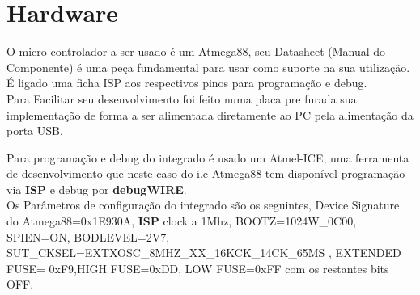 \documentclass[titlepage, a4paper, 10pt, reqno, openany]{report}
\begin{document}
	\section{Hardware}
	O micro-controlador a ser usado \'{e} um Atmega88, seu Datasheet (Manual do Componente) \'{e} uma pe\c{c}a fundamental para usar como suporte na sua utiliza\c{c}\~{a}o. \'{E} ligado uma ficha ISP aos respectivos pinos para programa\c{c}\~{a}o e debug. \\
	Para Facilitar seu desenvolvimento foi feito numa placa pre furada sua implementa\c{c}\~{a}o de forma a ser alimentada diretamente ao PC pela alimenta\c{c}\~{a}o da porta USB. \par
	Para programa\c{c}\~{a}o e debug do integrado \'{e} usado um Atmel-ICE, uma ferramenta de desenvolvimento que neste caso do i.c Atmega88 tem dispon\'{i}vel programa\c{c}\~{a}o via {\bf ISP} e debug por {\bf debugWIRE}. \\
	Os Par\^{a}metros de configura\c{c}\~{a}o do integrado s\~{a}o os seguintes, Device Signature do Atmega88=0x1E930A, {\bf ISP} clock a 1Mhz, BOOTZ=1024W\_0C00, SPIEN=ON, BODLEVEL=2V7, SUT\_CKSEL=EXTXOSC\_8MHZ\_XX\_16KCK\_14CK\_65MS , EXTENDED FUSE= 0xF9,HIGH FUSE=0xDD, LOW FUSE=0xFF com os restantes bits OFF. \\
\end{document}
